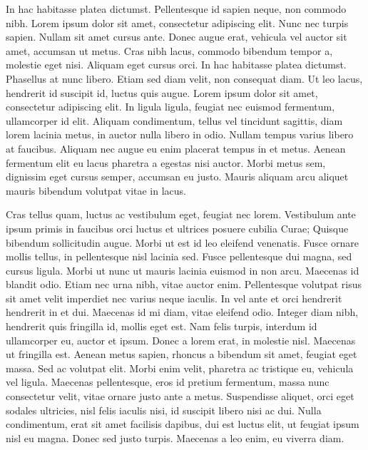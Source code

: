 \documentclass[letterpaper,12pt,twocolumn,landscape]{memoir}
\begin{document}
In hac habitasse platea dictumst. Pellentesque id sapien neque, non commodo nibh. Lorem ipsum dolor sit amet, consectetur adipiscing elit. Nunc nec turpis sapien. Nullam sit amet cursus ante. Donec augue erat, vehicula vel auctor sit amet, accumsan ut metus. Cras nibh lacus, commodo bibendum tempor a, molestie eget nisi. Aliquam eget cursus orci. In hac habitasse platea dictumst. Phasellus at nunc libero. Etiam sed diam velit, non consequat diam. Ut leo lacus, hendrerit id suscipit id, luctus quis augue.
Lorem ipsum dolor sit amet, consectetur adipiscing elit. In ligula ligula, feugiat nec euismod fermentum, ullamcorper id elit. Aliquam condimentum, tellus vel tincidunt sagittis, diam lorem lacinia metus, in auctor nulla libero in odio. Nullam tempus varius libero at faucibus. Aliquam nec augue eu enim placerat tempus in et metus. Aenean fermentum elit eu lacus pharetra a egestas nisi auctor. Morbi metus sem, dignissim eget cursus semper, accumsan eu justo. Mauris aliquam arcu aliquet mauris bibendum volutpat vitae in lacus.

Cras tellus quam, luctus ac vestibulum eget, feugiat nec lorem. Vestibulum ante ipsum primis in faucibus orci luctus et ultrices posuere cubilia Curae; Quisque bibendum sollicitudin augue. Morbi ut est id leo eleifend venenatis. Fusce ornare mollis tellus, in pellentesque nisl lacinia sed. Fusce pellentesque dui magna, sed cursus ligula. Morbi ut nunc ut mauris lacinia euismod in non arcu. Maecenas id blandit odio. Etiam nec urna nibh, vitae auctor enim. Pellentesque volutpat risus sit amet velit imperdiet nec varius neque iaculis. In vel ante et orci hendrerit hendrerit in et dui. Maecenas id mi diam, vitae eleifend odio. Integer diam nibh, hendrerit quis fringilla id, mollis eget est. Nam felis turpis, interdum id ullamcorper eu, auctor et ipsum. Donec a lorem erat, in molestie nisl. Maecenas ut fringilla est.
Aenean metus sapien, rhoncus a bibendum sit amet, feugiat eget massa. Sed ac volutpat elit. Morbi enim velit, pharetra ac tristique eu, vehicula vel ligula. Maecenas pellentesque, eros id pretium fermentum, massa nunc consectetur velit, vitae ornare justo ante a metus. Suspendisse aliquet, orci eget sodales ultricies, nisl felis iaculis nisi, id suscipit libero nisi ac dui. Nulla condimentum, erat sit amet facilisis dapibus, dui est luctus elit, ut feugiat ipsum nisl eu magna. Donec sed justo turpis. Maecenas a leo enim, eu viverra diam.
\end{document}
